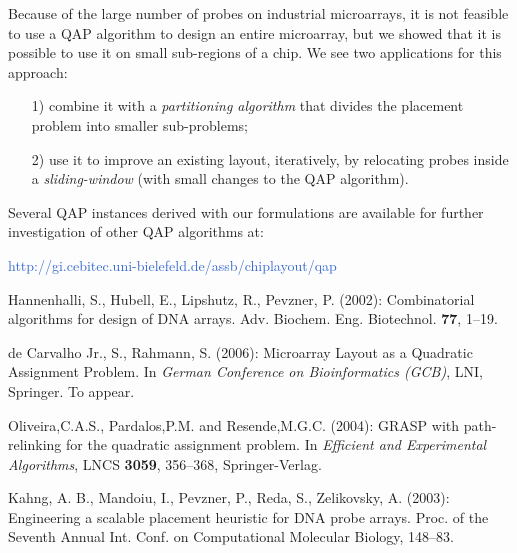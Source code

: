 \documentclass[portrait]{a0poster}
\newcommand{\myemph}[1]{\textcolor{highlight}{#1}}
\begin{document}
\begin{multicols}{3}[\aggiheader]
Because of the large number of probes on industrial microarrays, it is
not feasible to use a QAP algorithm to design an entire microarray, but we
showed that it is possible to use it on small sub-regions of a chip. We see two
applications for this approach:
\begin{itemize}
\item[1)] combine it with a \emph{partitioning algorithm} that divides
the placement problem into smaller sub-problems;
\item[2)] use it to improve an existing layout, iteratively, by relocating
probes inside a \emph{sliding-window} (with small changes to the QAP algorithm).
\end{itemize}


Several QAP instances derived with our formulations are available for
further investigation of other QAP algorithms at:

\vspace*{2ex}
\centerline{\myemph{http://gi.cebitec.uni-bielefeld.de/assb/chiplayout/qap}}

\begin{thebibliography}{9}

 Hannenhalli, S., Hubell, E., Lipshutz, R., Pevzner, P.
(2002): Combinatorial algorithms for design of DNA arrays. Adv. Biochem. Eng.
Biotechnol. {\bf 77}, 1--19.

de Carvalho Jr., S., Rahmann, S. (2006): Microarray Layout as a Quadratic
Assignment Problem. In {\it German Conference on Bioinformatics (GCB)}, LNI,
Springer. To appear.

 Oliveira,C.A.S., Pardalos,P.M. and Resende,M.G.C. (2004):
GRASP with path-relinking for the quadratic assignment problem. In
{\it Efficient and Experimental Algorithms}, LNCS {\bf 3059}, 356--368,
Springer-Verlag.

 Kahng, A. B., Mandoiu, I., Pevzner, P., Reda, S.,
Zelikovsky, A. (2003): Engineering a scalable placement heuristic for DNA probe
arrays. Proc. of the Seventh Annual Int. Conf. on Computational Molecular
Biology, 148--83.

\end{thebibliography}

\end{multicols}

\aggifooter

\end{document}
